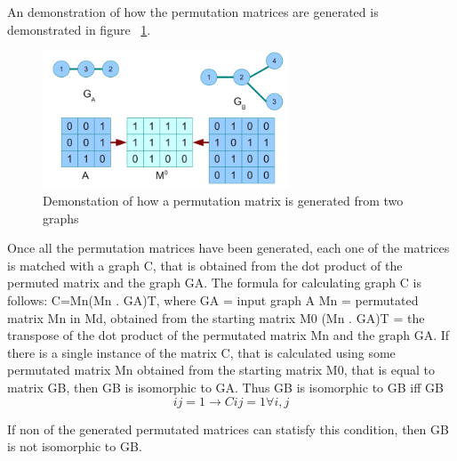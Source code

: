 An demonstration of how the permutation matrices are generated is demonstrated in figure ~\ref{fig:permutationmatrix}.

\begin{figure}[H]
  \begin{center}
      \includegraphics[width=0.65\textwidth]{permutationmatrix.png}
  \end{center}    
  \caption{Demonstation of how a permutation matrix is generated from two graphs} 
  \label{fig:permutationmatrix}
\end{figure} 

Once all the permutation matrices have been generated, each one of the matrices is matched with a graph C, that is obtained from the dot product of the permuted matrix and the graph G{\tiny A}.
The formula for calculating graph C is follows:
C=Mn(Mn . G{\tiny A})T, where
G{\tiny A} = input graph A
Mn = permutated matrix Mn in Md, obtained from the starting matrix M0
(Mn . G{\tiny A})T = the transpose of the dot product of the permutated matrix Mn and the graph G{\tiny A}.
If there is a single instance of the matrix C, that is calculated using some permutated matrix Mn obtained from the starting matrix M0, that is equal to matrix G{\tiny B}, then G{\tiny B} is isomorphic to G{\tiny A}. Thus G{\tiny B} is isomorphic to G{\tiny B} iff G{\tiny B}
  \begin{equation}	
	ij = 1 \rightarrow  Cij = 1 \forall i,j
  \end{equation} 


If non of the generated permutated matrices can statisfy this condition, then G{\tiny B} is not isomorphic to G{\tiny B}.
\newpage